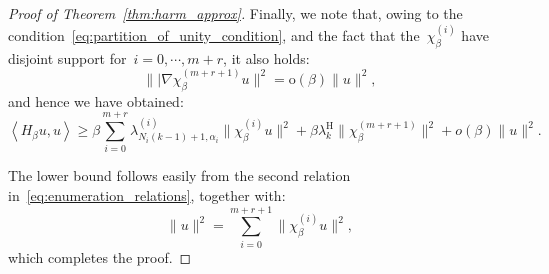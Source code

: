 \documentclass[10pt]{article}
\newcommand{\1}{\mathbbm 1}
\renewcommand{\o}{\mathrm{o}}
\begin{document}
\begin{proof}[Proof of Theorem~\ref{thm:harm_approx}]
        Finally, we note that, owing to the condition~\eqref{eq:partition_of_unity_condition}, and the fact that the~$\chi_\beta^{(i)}$ have disjoint support for~$i=0,\dotsm,m+r$, it also holds:
       ~$$\||\nabla \chi_\beta^{(m+r+1)}u\|^2 = \mathrm{o}(\beta)\|u\|^2,$$
        and hence we have obtained:
        \begin{equation}
            \left\langle H_\beta u,u \right\rangle \geq \beta \sum_{i=0}^{m+r} \lambda^{(i)}_{N_i(k-1)+1,\alpha_i}\|\chi_\beta^{(i)}u\|^2 + \beta\lambda_{k}^{\mathrm H}\|\chi_\beta^{(m+r+1)}\|^2 + o(\beta)\|u\|^2.
        \end{equation}

        The lower bound follows easily from the second relation in~\eqref{eq:enumeration_relations}, together with:
       ~$$\|u\|^2 = \sum_{i=0}^{m+r+1} \|\chi_\beta^{(i)}u\|^2,$$
        which completes the proof.




    \end{proof}
\end{document}
